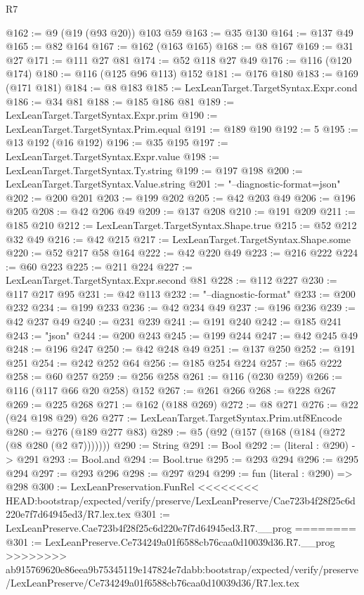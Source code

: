\begin{lexlean}{R7}
\begin{coremodule}
{{{{{{{{{{{{{@162 := @9 (@19 (@93 @20)) @103 @59
@163 := @35 @130
@164 := @137 @49
@165 := @82 @164
@167 := @162 (@163 @165)
@168 := @8 @167
@169 := @31 @27
@171 := @111 @27 @81
@174 := @52 @118 @27 @49
@176 := @116 (@120 @174)
@180 := @116 (@125 @96 @113) @152
@181 := @176 @180
@183 := @169 (@171 @181)
@184 := @8 @183
@185 := LexLeanTarget.TargetSyntax.Expr.cond
@186 := @34 @81
@188 := @185 @186 @81
@189 := LexLeanTarget.TargetSyntax.Expr.prim
@190 := LexLeanTarget.TargetSyntax.Prim.equal
@191 := @189 @190
@192 := 5
@195 := @13 @192 (@16 @192)
@196 := @35 @195
@197 := LexLeanTarget.TargetSyntax.Expr.value
@198 := LexLeanTarget.TargetSyntax.Ty.string
@199 := @197 @198
@200 := LexLeanTarget.TargetSyntax.Value.string
@201 := "--diagnostic-format=json"
@202 := @200 @201
@203 := @199 @202
@205 := @42 @203 @49
@206 := @196 @205
@208 := @42 @206 @49
@209 := @137 @208
@210 := @191 @209
@211 := @185 @210
@212 := LexLeanTarget.TargetSyntax.Shape.true
@215 := @52 @212 @32 @49
@216 := @42 @215
@217 := LexLeanTarget.TargetSyntax.Shape.some
@220 := @52 @217 @58 @164
@222 := @42 @220 @49
@223 := @216 @222
@224 := @60 @223
@225 := @211 @224
@227 := LexLeanTarget.TargetSyntax.Expr.second @81
@228 := @112 @227
@230 := @117 @217 @95
@231 := @42 @113
@232 := "--diagnostic-format"
@233 := @200 @232
@234 := @199 @233
@236 := @42 @234 @49
@237 := @196 @236
@239 := @42 @237 @49
@240 := @231 @239
@241 := @191 @240
@242 := @185 @241
@243 := "json"
@244 := @200 @243
@245 := @199 @244
@247 := @42 @245 @49
@248 := @196 @247
@250 := @42 @248 @49
@251 := @137 @250
@252 := @191 @251
@254 := @242 @252 @64
@256 := @185 @254 @224
@257 := @65 @222
@258 := @60 @257
@259 := @256 @258
@261 := @116 (@230 @259)
@266 := @116 (@117 @66 @20 @258) @152
@267 := @261 @266
@268 := @228 @267
@269 := @225 @268
@271 := @162 (@188 @269)
@272 := @8 @271
@276 := @22 (@24 @198 @29) @26
@277 := LexLeanTarget.TargetSyntax.Prim.utf8Encode
@280 := @276 (@189 @277 @83)
@289 := @5 (@92 (@157 (@168 (@184 (@272 (@8 @280 (@2 @7)))))))
@290 := String
@291 := Bool
@292 := (literal : @290) -> @291
@293 := Bool.and
@294 := Bool.true
@295 := @293 @294
@296 := @295 @294
@297 := @293 @296
@298 := @297 @294
@299 := fun (literal : @290) => @298
@300 := LexLeanPreservation.FunRel
<<<<<<<< HEAD:bootstrap/expected/verify/preserve/LexLeanPreserve/Cae723b4f28f25c6d220e7f7d64945ed3/R7.lex.tex
@301 := LexLeanPreserve.Cae723b4f28f25c6d220e7f7d64945ed3.R7.__prog
========
@301 := LexLeanPreserve.Ce734249a01f6588cb76caa0d10039d36.R7.__prog
>>>>>>>> ab915769620e86eea9b75345119e147824e7dabb:bootstrap/expected/verify/preserve/LexLeanPreserve/Ce734249a01f6588cb76caa0d10039d36/R7.lex.tex
}}}}}}}}}}}}}
\end{coremodule}
\end{lexlean}
